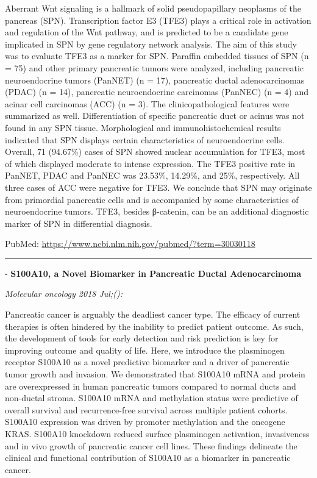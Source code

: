 \documentclass[]{article}
\begin{document}
Aberrant Wnt signaling is a hallmark of solid pseudopapillary neoplasms
of the pancreas (SPN). Transcription factor E3 (TFE3) plays a critical
role in activation and regulation of the Wnt pathway, and is predicted
to be a candidate gene implicated in SPN by gene regulatory network
analysis. The aim of this study was to evaluate TFE3 as a marker for
SPN. Paraffin embedded tissues of SPN (n = 75) and other primary
pancreatic tumors were analyzed, including pancreatic neuroendocrine
tumors (PanNET) (n = 17), pancreatic ductal adenocarcinomas (PDAC) (n =
14), pancreatic neuroendocrine carcinomas (PanNEC) (n = 4) and acinar
cell carcinomas (ACC) (n = 3). The clinicopathological features were
summarized as well. Differentiation of specific pancreatic duct or
acinus was not found in any SPN tissue. Morphological and
immunohistochemical results indicated that SPN displays certain
characteristics of neuroendocrine cells. Overall, 71 (94.67\%) cases of
SPN showed nuclear accumulation for TFE3, most of which displayed
moderate to intense expression. The TFE3 positive rate in PanNET, PDAC
and PanNEC was 23.53\%, 14.29\%, and 25\%, respectively. All three cases
of ACC were negative for TFE3. We conclude that SPN may originate from
primordial pancreatic cells and is accompanied by some characteristics
of neuroendocrine tumors. TFE3, besides β-catenin, can be an additional
diagnostic marker of SPN in differential diagnosis.

PubMed: \url{https://www.ncbi.nlm.nih.gov/pubmed/?term=30030118}

{}

{}

\begin{center}\rule{0.5\linewidth}{\linethickness}\end{center}

 - \textbf{S100A10, a Novel Biomarker in Pancreatic Ductal
Adenocarcinoma}

\emph{Molecular oncology 2018 Jul;():}

Pancreatic cancer is arguably the deadliest cancer type. The efficacy of
current therapies is often hindered by the inability to predict patient
outcome. As such, the development of tools for early detection and risk
prediction is key for improving outcome and quality of life. Here, we
introduce the plasminogen receptor S100A10 as a novel predictive
biomarker and a driver of pancreatic tumor growth and invasion. We
demonstrated that S100A10 mRNA and protein are overexpressed in human
pancreatic tumors compared to normal ducts and non-ductal stroma.
S100A10 mRNA and methylation status were predictive of overall survival
and recurrence-free survival across multiple patient cohorts. S100A10
expression was driven by promoter methylation and the oncogene KRAS.
S100A10 knockdown reduced surface plasminogen activation, invasiveness
and in vivo growth of pancreatic cancer cell lines. These findings
delineate the clinical and functional contribution of S100A10 as a
biomarker in pancreatic cancer.
\end{document}
